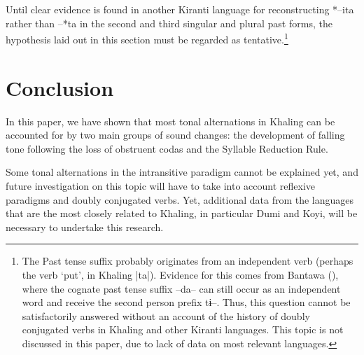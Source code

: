 \documentclass[oldfontcommands,oneside,a4paper,11pt]{article}
\newcommand{\ipa}[1]{{\phon \mbox{#1}}} %
\begin{document}
Until clear evidence is found in another Kiranti language for reconstructing \ipa{*--ita} rather than \ipa{--*ta} in the second and third singular and plural past forms, the hypothesis laid out in this section must be regarded as tentative.\footnote{The Past tense suffix probably originates from an independent verb (perhaps the verb `put', in Khaling |\ipa{ta}|). Evidence for this comes from Bantawa (\citealt[165-72]{doornenbal09}), where the cognate past tense suffix \ipa{--da--} can still occur as an independent word and receive the second person prefix \ipa{tɨ--}. Thus, this question cannot be satisfactorily answered without an account of the history of doubly conjugated verbs in Khaling and other Kiranti languages. This topic is not discussed in this paper, due to lack of data on most relevant languages.
}

\section{Conclusion}

In this paper, we have shown that most tonal alternations in Khaling can be accounted for by two main groups of sound changes: the development of falling tone following the loss of obstruent codas  and the Syllable Reduction Rule.

Some tonal alternations in the intransitive paradigm cannot be explained yet, and future investigation on this topic will have to take into account reflexive paradigms and doubly conjugated verbs. Yet, additional data from the languages that are the most closely related to Khaling, in particular Dumi and Koyi, will be necessary to undertake this research.





\end{document}
